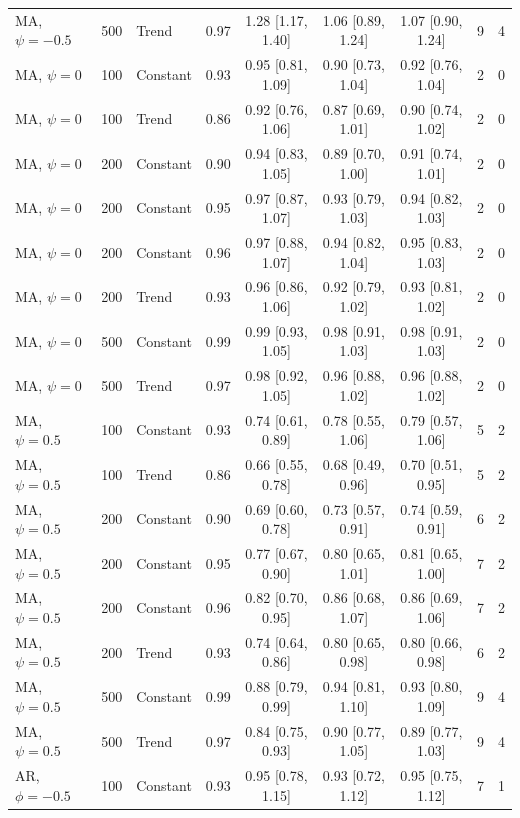 \begin{tabular}{lrlcccccc}
MA, $\psi = -0.5$ & 500 & Trend & 0.97 & 1.28 [1.17, 1.40] & 1.06 [0.89, 1.24] & 1.07 [0.90, 1.24] & 9 & 4 \\
\addlinespace
MA, $\psi = 0$ & 100 & Constant & 0.93 & 0.95 [0.81, 1.09] & 0.90 [0.73, 1.04] & 0.92 [0.76, 1.04] & 2 & 0 \\
MA, $\psi = 0$ & 100 & Trend & 0.86 & 0.92 [0.76, 1.06] & 0.87 [0.69, 1.01] & 0.90 [0.74, 1.02] & 2 & 0 \\
MA, $\psi = 0$ & 200 & Constant & 0.90 & 0.94 [0.83, 1.05] & 0.89 [0.70, 1.00] & 0.91 [0.74, 1.01] & 2 & 0 \\
MA, $\psi = 0$ & 200 & Constant & 0.95 & 0.97 [0.87, 1.07] & 0.93 [0.79, 1.03] & 0.94 [0.82, 1.03] & 2 & 0 \\
MA, $\psi = 0$ & 200 & Constant & 0.96 & 0.97 [0.88, 1.07] & 0.94 [0.82, 1.04] & 0.95 [0.83, 1.03] & 2 & 0 \\
MA, $\psi = 0$ & 200 & Trend & 0.93 & 0.96 [0.86, 1.06] & 0.92 [0.79, 1.02] & 0.93 [0.81, 1.02] & 2 & 0 \\
MA, $\psi = 0$ & 500 & Constant & 0.99 & 0.99 [0.93, 1.05] & 0.98 [0.91, 1.03] & 0.98 [0.91, 1.03] & 2 & 0 \\
MA, $\psi = 0$ & 500 & Trend & 0.97 & 0.98 [0.92, 1.05] & 0.96 [0.88, 1.02] & 0.96 [0.88, 1.02] & 2 & 0 \\
\addlinespace
MA, $\psi = 0.5$ & 100 & Constant & 0.93 & 0.74 [0.61, 0.89] & 0.78 [0.55, 1.06] & 0.79 [0.57, 1.06] & 5 & 2 \\
MA, $\psi = 0.5$ & 100 & Trend & 0.86 & 0.66 [0.55, 0.78] & 0.68 [0.49, 0.96] & 0.70 [0.51, 0.95] & 5 & 2 \\
MA, $\psi = 0.5$ & 200 & Constant & 0.90 & 0.69 [0.60, 0.78] & 0.73 [0.57, 0.91] & 0.74 [0.59, 0.91] & 6 & 2 \\
MA, $\psi = 0.5$ & 200 & Constant & 0.95 & 0.77 [0.67, 0.90] & 0.80 [0.65, 1.01] & 0.81 [0.65, 1.00] & 7 & 2 \\
MA, $\psi = 0.5$ & 200 & Constant & 0.96 & 0.82 [0.70, 0.95] & 0.86 [0.68, 1.07] & 0.86 [0.69, 1.06] & 7 & 2 \\
MA, $\psi = 0.5$ & 200 & Trend & 0.93 & 0.74 [0.64, 0.86] & 0.80 [0.65, 0.98] & 0.80 [0.66, 0.98] & 6 & 2 \\
MA, $\psi = 0.5$ & 500 & Constant & 0.99 & 0.88 [0.79, 0.99] & 0.94 [0.81, 1.10] & 0.93 [0.80, 1.09] & 9 & 4 \\
MA, $\psi = 0.5$ & 500 & Trend & 0.97 & 0.84 [0.75, 0.93] & 0.90 [0.77, 1.05] & 0.89 [0.77, 1.03] & 9 & 4 \\
\addlinespace
AR, $\phi = -0.5$ & 100 & Constant & 0.93 & 0.95 [0.78, 1.15] & 0.93 [0.72, 1.12] & 0.95 [0.75, 1.12] & 7 & 1 \\

\end{tabular}
